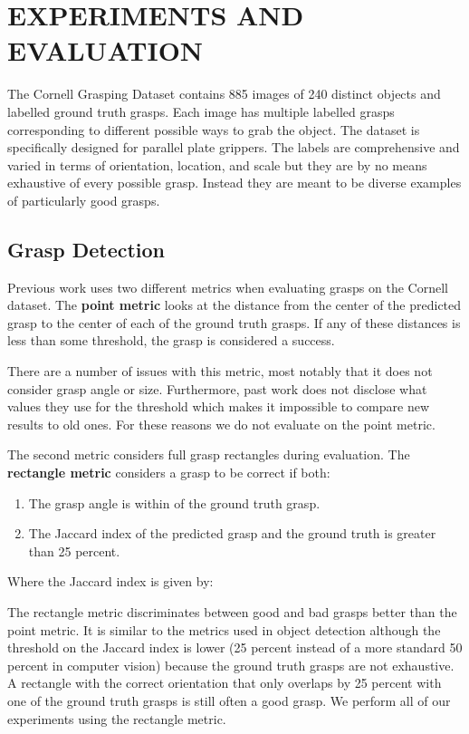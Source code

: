 \documentclass[letterpaper, 10 pt, conference]{ieeeconf}
\begin{document}
\section{EXPERIMENTS AND EVALUATION}

The Cornell Grasping Dataset \cite{cornelldata} contains 885 images of 240 distinct objects and labelled ground truth grasps. Each image has multiple labelled grasps corresponding to different possible ways to grab the object. The dataset is specifically designed for parallel plate grippers. The labels are comprehensive and varied in terms of orientation, location, and scale but they are by no means exhaustive of every possible grasp. Instead they are meant to be diverse examples of particularly good grasps.

\subsection{Grasp Detection}

Previous work uses two different metrics when evaluating grasps on the Cornell dataset. The \textbf{point metric} looks at the distance from the center of the predicted grasp to the center of each of the ground truth grasps. If any of these distances is less than some threshold, the grasp is considered a success.

There are a number of issues with this metric, most notably that it does not consider grasp angle or size. Furthermore, past work does not disclose what values they use for the threshold which makes it impossible to compare new results to old ones. For these reasons we do not evaluate on the point metric.

The second metric considers full grasp rectangles during evaluation. The \textbf{rectangle metric} considers a grasp to be correct if both:
\begin{enumerate}
\item
The grasp angle is within  of the ground truth grasp.
\item 
The Jaccard index of the predicted grasp and the ground truth is greater than 25 percent.
\end{enumerate}
Where the Jaccard index is given by:


The rectangle metric discriminates between good and bad grasps better than the point metric. It is similar to the metrics used in object detection although the threshold on the Jaccard index is lower (25 percent instead of a more standard 50 percent in computer vision) because the ground truth grasps are not exhaustive. A rectangle with the correct orientation that only overlaps by 25 percent with one of the ground truth grasps is still often a good grasp. We perform all of our experiments using the rectangle metric.
\end{document}
